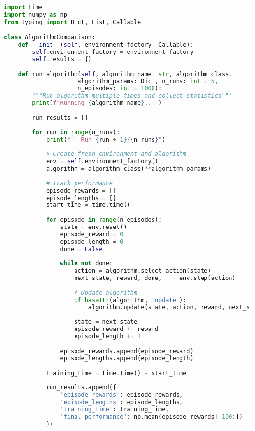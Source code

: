 \begin{lstlisting}[language=Python, caption=Algorithm Comparison]
import time
import numpy as np
from typing import Dict, List, Callable

class AlgorithmComparison:
    def __init__(self, environment_factory: Callable):
        self.environment_factory = environment_factory
        self.results = {}
    
    def run_algorithm(self, algorithm_name: str, algorithm_class, 
                     algorithm_params: Dict, n_runs: int = 5, 
                     n_episodes: int = 1000):
        """Run algorithm multiple times and collect statistics"""
        print(f"Running {algorithm_name}...")
        
        run_results = []
        
        for run in range(n_runs):
            print(f"  Run {run + 1}/{n_runs}")
            
            # Create fresh environment and algorithm
            env = self.environment_factory()
            algorithm = algorithm_class(**algorithm_params)
            
            # Track performance
            episode_rewards = []
            episode_lengths = []
            start_time = time.time()
            
            for episode in range(n_episodes):
                state = env.reset()
                episode_reward = 0
                episode_length = 0
                done = False
                
                while not done:
                    action = algorithm.select_action(state)
                    next_state, reward, done, _ = env.step(action)
                    
                    # Update algorithm
                    if hasattr(algorithm, 'update'):
                        algorithm.update(state, action, reward, next_state, done)
                    
                    state = next_state
                    episode_reward += reward
                    episode_length += 1
                
                episode_rewards.append(episode_reward)
                episode_lengths.append(episode_length)
            
            training_time = time.time() - start_time
            
            run_results.append({
                'episode_rewards': episode_rewards,
                'episode_lengths': episode_lengths,
                'training_time': training_time,
                'final_performance': np.mean(episode_rewards[-100:])
            })
        

\end{lstlisting}
